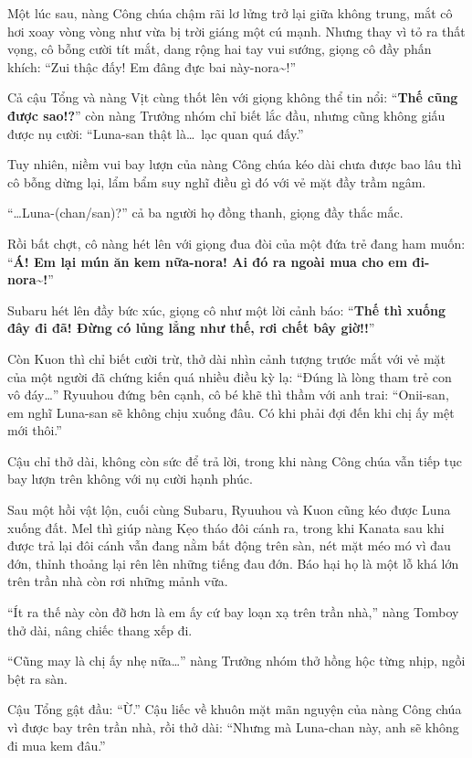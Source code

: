 \documentclass[../main.tex]{subfiles}
\begin{document}
Một lúc sau, nàng Công chúa chậm rãi lơ lửng trở lại giữa không trung, mắt cô hơi xoay vòng vòng như vừa bị trời giáng một cú mạnh. Nhưng thay vì tỏ ra thất vọng, cô bỗng cười tít mắt, dang rộng hai tay vui sướng, giọng cô đầy phấn khích: ``Zui thậc đấy! Em đâng đực bai này-nora\~{}!''

Cả cậu Tổng và nàng Vịt cùng thốt lên với giọng không thể tin nổi: ``\textbf{Thế cũng được sao!?}'' còn nàng Trưởng nhóm chỉ biết lắc đầu, nhưng cũng không giấu được nụ cười: ``Luna-san thật là\dots\ lạc quan quá đấy.''

Tuy nhiên, niềm vui bay lượn của nàng Công chúa kéo dài chưa được bao lâu thì cô bỗng dừng lại, lẩm bẩm suy nghĩ điều gì đó với vẻ mặt đầy trầm ngâm.

``\dots Luna-(chan/san)?'' cả ba người họ đồng thanh, giọng đầy thắc mắc.

Rồi bất chợt, cô nàng hét lên với giọng đua đòi của một đứa trẻ đang ham muốn: ``\textbf{Á! Em lại mún ăn kem nữa-nora! Ai đó ra ngoài mua cho em đi-nora\~{}!}''

Subaru hét lên đầy bức xúc, giọng cô như một lời cảnh báo: ``\textbf{Thế thì xuống đây đi đã! Đừng có lủng lẳng như thế, rơi chết bây giờ!!}''

Còn Kuon thì chỉ biết cười trừ, thở dài nhìn cảnh tượng trước mắt với vẻ mặt của một người đã chứng kiến quá nhiều điều kỳ lạ: ``Đúng là lòng tham trẻ con vô đáy\dots'' Ryuuhou đứng bên cạnh, cô bé khẽ thì thầm với anh trai: ``Onii-san, em nghĩ Luna-san sẽ không chịu xuống đâu. Có khi phải đợi đến khi chị ấy mệt mới thôi.''

Cậu chỉ thở dài, không còn sức để trả lời, trong khi nàng Công chúa vẫn tiếp tục bay lượn trên không với nụ cười hạnh phúc.
\omk

Sau một hồi vật lộn, cuối cùng Subaru, Ryuuhou và Kuon cũng kéo được Luna xuống đất. Mel thì giúp nàng Kẹo tháo đôi cánh ra, trong khi Kanata sau khi được trả lại đôi cánh vẫn đang nằm bất động trên sàn, nét mặt méo mó vì đau đớn, thỉnh thoảng lại rên lên những tiếng đau đớn. Báo hại họ là một lỗ khá lớn trên trần nhà còn rơi những mảnh vữa.

``Ít ra thế này còn đỡ hơn là em ấy cứ bay loạn xạ trên trần nhà,'' nàng Tomboy thở dài, nâng chiếc thang xếp đi.

``Cũng may là chị ấy nhẹ nữa\dots'' nàng Trưởng nhóm thở hồng hộc từng nhịp, ngồi bệt ra sàn.

Cậu Tổng gật đầu: ``Ừ.'' Cậu liếc về khuôn mặt mãn nguyện của nàng Công chúa vì được bay trên trần nhà, rồi thở dài: ``Nhưng mà Luna-chan này, anh sẽ không đi mua kem đâu.''
\end{document}
